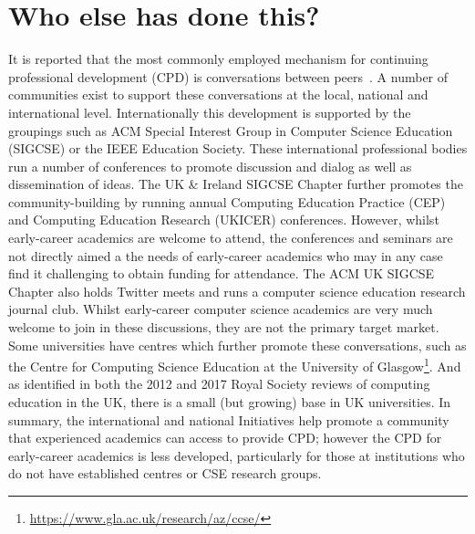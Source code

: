 \documentclass[sigconf]{acmart}
\begin{document}
\section{Who else has done this?}
It is reported that the most commonly employed mechanism for
continuing professional development (CPD) is conversations between
peers~\cite{King2004}. A number of communities exist to support these
conversations at the local, national and international
level. Internationally this development is supported by the groupings
such as ACM Special Interest Group in Computer Science Education
(SIGCSE) or the IEEE Education Society. These international
professional bodies run a number of conferences to promote discussion
and dialog as well as dissemination of ideas. The UK \& Ireland SIGCSE
Chapter further promotes the community-building by running annual
Computing Education Practice (CEP) and Computing Education Research
(UKICER) conferences. However, whilst
early-career academics are welcome to attend, the conferences and
seminars are not directly aimed a the needs of early-career academics
who may in any case find it challenging to obtain funding for
attendance. The ACM UK SIGCSE Chapter also holds Twitter meets and
runs a computer science education research journal club. Whilst
early-career computer science academics are very much welcome to join
in these discussions, they are not the primary target market. Some
universities have centres which further promote these conversations,
such as the Centre for Computing Science Education at the University
of
Glasgow\footnote{\url{https://www.gla.ac.uk/research/az/ccse/}}. 
And as identified in both the 2012 and 2017 Royal Society reviews of
computing education in the UK, there is a small (but growing) base in
UK universities. In summary, the international and national
Initiatives help promote a community that experienced academics can
access to provide CPD; however the CPD for early-career academics is
less developed, particularly for those at institutions who do not have
established centres or CSE research groups.

\end{document}
